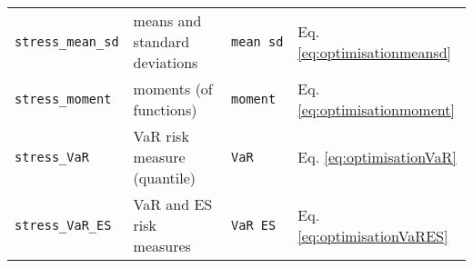\documentclass[
]{article}
\begin{document}
\begin{longtable}[]{@{}llll@{}}
\begin{minipage}[t]{0.20\columnwidth}
\texttt{stress\_mean\_sd}\strut
\end{minipage} & \begin{minipage}[t]{0.39\columnwidth}\raggedright
means and standard deviations\strut
\end{minipage} & \begin{minipage}[t]{0.09\columnwidth}\raggedright
\texttt{mean\ sd}\strut
\end{minipage} & \begin{minipage}[t]{0.20\columnwidth}\raggedright
Eq. \eqref{eq:optimisationmeansd}\strut
\end{minipage}\tabularnewline
\begin{minipage}[t]{0.20\columnwidth}\raggedright
\texttt{stress\_moment}\strut
\end{minipage} & \begin{minipage}[t]{0.39\columnwidth}\raggedright
moments (of functions)\strut
\end{minipage} & \begin{minipage}[t]{0.09\columnwidth}\raggedright
\texttt{moment}\strut
\end{minipage} & \begin{minipage}[t]{0.20\columnwidth}\raggedright
Eq. \eqref{eq:optimisationmoment}\strut
\end{minipage}\tabularnewline
\begin{minipage}[t]{0.20\columnwidth}\raggedright
\texttt{stress\_VaR}\strut
\end{minipage} & \begin{minipage}[t]{0.39\columnwidth}\raggedright
VaR risk measure (quantile)\strut
\end{minipage} & \begin{minipage}[t]{0.09\columnwidth}\raggedright
\texttt{VaR}\strut
\end{minipage} & \begin{minipage}[t]{0.20\columnwidth}\raggedright
Eq. \eqref{eq:optimisationVaR}\strut
\end{minipage}\tabularnewline
\begin{minipage}[t]{0.20\columnwidth}\raggedright
\texttt{stress\_VaR\_ES}\strut
\end{minipage} & \begin{minipage}[t]{0.39\columnwidth}\raggedright
VaR and ES risk measures\strut
\end{minipage} & \begin{minipage}[t]{0.09\columnwidth}\raggedright
\texttt{VaR\ ES}\strut
\end{minipage} & \begin{minipage}[t]{0.20\columnwidth}\raggedright
Eq. \eqref{eq:optimisationVaRES}\strut
\end{minipage}\tabularnewline
\bottomrule
\end{longtable}
\end{document}
